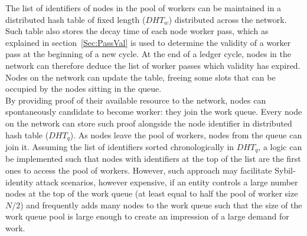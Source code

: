 The list of identifiers of nodes in the pool of workers can be maintained in a distributed hash table of fixed length ($DHT_w$) distributed across the network. Such table also stores the decay time of each node worker pass, which as explained in section~\ref{Sec:PassVal} is used to determine the validity of a worker pass at the beginning of a new cycle. At the end of a ledger cycle, nodes in the network can therefore deduce the list of worker passes which validity has expired. Nodes on the network can update the table, freeing some slots that can be occupied by the nodes sitting in the queue. \\

By providing proof of their available resource to the network, nodes can spontaneously candidate to become worker: they join the work queue. Every node on the network can store such proof alongside the node identifier in distributed hash table ($DHT_q$). As nodes leave the pool of workers, nodes from the queue can join it. Assuming the list of identifiers sorted chronologically in $DHT_q$, a logic can be implemented such that nodes with identifiers at the top of the list are the first ones to access the pool of workers. However, such approach may facilitate Sybil-identity attack scenarios, however expensive, if an entity controls a large number nodes at the top of the work queue (at least equal to half the pool of worker size $N/2$) and frequently adds many nodes to the work queue such that the size of the work queue pool is large enough to create an impression of a large demand for work.\\

